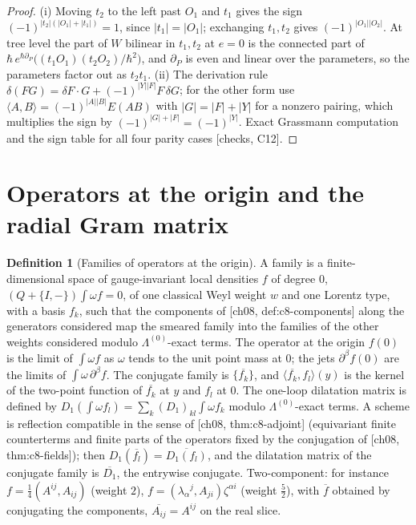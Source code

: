 \documentclass[11pt]{report}
\theoremstyle{plain}
\theoremstyle{definition}
\newtheorem{definition}[theorem]{Definition}
\numberwithin{equation}{chapter}
\begin{document}
\begin{proof}
(i) Moving $t_2$ to the left past $O_1$ and $t_1$ gives the sign $(-1)^{|t_2|(|O_1|+|t_1|)}=1$, since $|t_1|=|O_1|$; exchanging $t_1,t_2$ gives $(-1)^{|O_1||O_2|}$. At tree level the part of $W$ bilinear in $t_1,t_2$ at $e=0$ is the connected part of $\hbar\,e^{\hbar\partial_P}\big((t_1O_1)(t_2O_2)/\hbar^2\big)$, and $\partial_P$ is even and linear over the parameters, so the parameters factor out as $t_2t_1$. (ii) The derivation rule $\delta(FG)=\delta F\cdot G+(-1)^{|Y||F|}F\,\delta G$; for the other form use $\langle A,B\rangle=(-1)^{|A||B|}E(AB)$ with $|G|=|F|+|Y|$ for a nonzero pairing, which multiplies the sign by $(-1)^{|G|+|F|}=(-1)^{|Y|}$. Exact Grassmann computation and the sign table for all four parity cases [checks, C12].
\end{proof}

\section{Operators at the origin and the radial Gram matrix}

\begin{definition}[Families of operators at the origin]
\label{def:ip-family}
A family is a finite-dimensional space of gauge-invariant local densities $f$ of degree $0$, $(Q+\{I,-\})\int\omega f=0$, of one classical Weyl weight $w$ and one Lorentz type, with a basis $f_k$, such that the components of [ch08, def:c8-components] along the generators considered map the smeared family into the families of the other weights considered modulo $\Lambda^{(0)}$-exact terms. The operator at the origin $f(0)$ is the limit of $\int\omega f$ as $\omega$ tends to the unit point mass at $0$; the jets $\partial^\beta f(0)$ are the limits of $\int\omega\,\partial^\beta f$. The conjugate family is $\{\overline{f_k}\}$, and $\langle\overline{f_k},f_l\rangle(y)$ is the kernel of the two-point function of $\overline{f_k}$ at $y$ and $f_l$ at $0$. The one-loop dilatation matrix is defined by $D_1(\int\omega f_l)=\sum_k(D_1)_{kl}\int\omega f_k$ modulo $\Lambda^{(0)}$-exact terms. A scheme is reflection compatible in the sense of [ch08, thm:c8-adjoint] (equivariant finite counterterms and finite parts of the operators fixed by the conjugation of [ch08, thm:c8-fields]); then $D_1(\overline{f_l})=\overline{D_1(f_l)}$, and the dilatation matrix of the conjugate family is $\overline{D_1}$, the entrywise conjugate. Two-component: for instance $f=\tfrac14(A^{ij},A_{ij})$ (weight $2$), $f=(\lambda_\alpha{}^j,A_{ji})\zeta^{\alpha i}$ (weight $\tfrac52$), with $\overline f$ obtained by conjugating the components, $\overline{A_{ij}}=A^{ij}$ on the real slice.
\end{definition}
\end{document}
